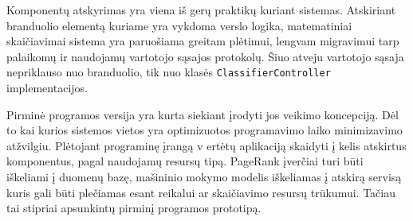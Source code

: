 Komponentų atskyrimas yra viena iš gerų praktikų kuriant sistemas. Atskiriant branduolio elementą kuriame yra vykdoma verslo logika, matematiniai skaičiavimai sistema yra paruošiama greitam plėtimui, lengvam migravimui tarp palaikomų ir naudojamų vartotojo sąsajos protokolų. Šiuo atveju vartotojo sąsaja nepriklauso nuo branduolio, tik nuo klasės \texttt{ClassifierController} implementacijos.

Pirminė programos versija yra kurta siekiant įrodyti jos veikimo koncepciją. Dėl to kai kurios sistemos vietos yra optimizuotos programavimo laiko minimizavimo atžvilgiu. Plėtojant programinę įrangą v ertėtų aplikaciją skaidyti į kelis atskirtus komponentus, pagal naudojamų resursų tipą. PageRank įverčiai turi būti iškeliami į duomenų bazę, mašininio mokymo modelis iškeliamas į atskirą servisą kuris gali būti plečiamas esant reikalui ar skaičiavimo resursų trūkumui. Tačiau tai stipriai apsunkintų pirminį programos prototipą.